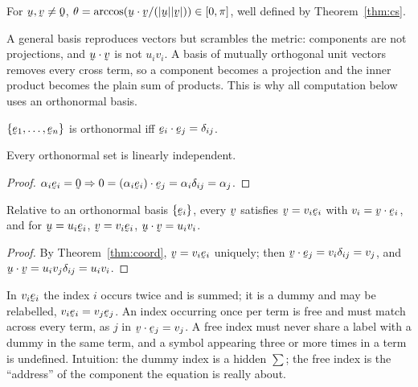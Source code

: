 \begin{definition}[Angle]\label{def:angle}
For $\bu,\bv\neq\bze$, $\theta=\arccos(\ip\bu\bv/(|\bu||\bv|))\in[0,\pi]$,
well defined by Theorem~\ref{thm:cs}.
\end{definition}

A general basis reproduces vectors but scrambles the metric: components are
not projections, and $\ip\bu\bv$ is not $u_iv_i$. A basis of mutually
orthogonal unit vectors removes every cross term, so a component becomes a
projection and the inner product becomes the plain sum of products. This is
why all computation below uses an orthonormal basis.

\begin{definition}\label{def:onb}
$\{\be_{1},\dots,\be_{n}\}$ is orthonormal iff
$\ip{\be_{i}}{\be_{j}}=\dd_{ij}$.
\end{definition}

\begin{proposition}\label{prop:onlindep}
Every orthonormal set is linearly independent.
\end{proposition}

\begin{proof}
$\alpha_{i}\be_{i}=\bze\Rightarrow
0=\ip{(\alpha_{i}\be_{i})}{\be_{j}}=\alpha_{i}\dd_{ij}=\alpha_{j}$.
\end{proof}

\begin{proposition}\label{prop:comp}
Relative to an orthonormal basis $\{\be_{i}\}$, every $\bv$ satisfies
$\bv=v_{i}\be_{i}$ with $v_{i}=\ip\bv{\be_{i}}$, and for
$\bu=u_{i}\be_{i}$, $\bv=v_{i}\be_{i}$, $\ip\bu\bv=u_{i}v_{i}$.
\end{proposition}

\begin{proof}
By Theorem~\ref{thm:coord}, $\bv=v_{i}\be_{i}$ uniquely; then
$\ip\bv{\be_{j}}=v_{i}\dd_{ij}=v_{j}$, and
$\ip\bu\bv=u_{i}v_{j}\dd_{ij}=u_{i}v_{i}$.
\end{proof}

\begin{remark}\label{rem:sum}
In $v_{i}\be_{i}$ the index $i$ occurs twice and is summed; it is a dummy
and may be relabelled, $v_{i}\be_{i}=v_{j}\be_{j}$. An index occurring once
per term is free and must match across every term, as $j$ in
$\ip\bv{\be_{j}}=v_{j}$. A free index must never share a label with a dummy
in the same term, and a symbol appearing three or more times in a term is
undefined. Intuition: the dummy index is a hidden $\textstyle\sum$; the
free index is the ``address'' of the component the equation is really
about.
\end{remark}

